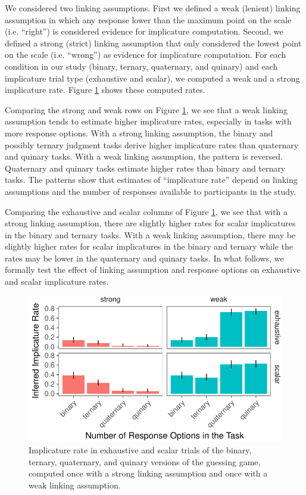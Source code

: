 \documentclass[floatsintext,man]{apa6}
\theoremstyle{definition}
\theoremstyle{definition}
\theoremstyle{definition}
\theoremstyle{remark}
\begin{document}
We considered two linking assumptions. First we defined a weak (lenient)
linking assumption in which any response lower than the maximum point on
the scale (i.e. \enquote{right}) is considered evidence for implicature
computation. Second, we defined a strong (strict) linking assumption
that only considered the lowest point on the scale (i.e.
\enquote{wrong}) as evidence for implicature computation. For each
condition in our study (binary, ternary, quaternary, and quinary) and
each implicature trial type (exhaustive and scalar), we computed a weak
and a strong implicature rate. Figure \ref{fig:implicatureRatePlot}
shows these computed rates.

Comparing the strong and weak rows on Figure
\ref{fig:implicatureRatePlot}, we see that a weak linking assumption
tends to estimate higher implicature rates, especially in tasks with
more response options. With a strong linking assumption, the binary and
possibly ternary judgment tasks derive higher implicature rates than
quaternary and quinary tasks. With a weak linking assumption, the
pattern is reversed. Quaternary and quinary tasks estimate higher rates
than binary and ternary tasks. The patterns show that estimates of
\enquote{implicature rate} depend on linking assumptions and the number
of responses available to participants in the study.

Comparing the exhaustive and scalar columns of Figure
\ref{fig:implicatureRatePlot}, we see that with a strong linking
assumption, there are slightly higher rates for scalar implicatures in
the binary and ternary tasks. With a weak linking assumption, there may
be slightly higher rates for scalar implicatures in the binary and
ternary while the rates may be lower in the quaternary and quinary
tasks. In what follows, we formally test the effect of linking
assumption and response options on exhaustive and scalar implicature
rates.

\begin{figure}
\centering
\includegraphics{writeup_files/figure-latex/implicatureRatePlot-1.pdf}
\caption{\label{fig:implicatureRatePlot}Implicature rate in exhaustive and
scalar trials of the binary, ternary, quaternary, and quinary versions
of the guessing game, computed once with a strong linking assumption and
once with a weak linking assumption.}
\end{figure}
\end{document}
